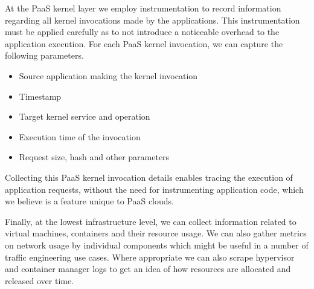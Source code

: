 \documentclass[11pt]{article}
\begin{document}
At the PaaS kernel layer we employ instrumentation to record information regarding all kernel invocations
made by the applications. This instrumentation must be applied carefully as to not introduce a noticeable
overhead to the application execution. For each PaaS kernel invocation, we can capture the 
following parameters.
\begin{itemize}
\item Source application making the kernel invocation
\item Timestamp
\item Target kernel service and operation
\item Execution time of the invocation
\item Request size, hash and other parameters
\end{itemize}
Collecting this PaaS kernel invocation details enables tracing the execution of application 
requests, without the need for instrumenting application code, which we believe is a feature 
unique to PaaS clouds. 

Finally, at the lowest infrastructure level, we can collect information related to virtual machines, containers
and their resource usage. We can also gather metrics on network usage by individual components which
might be useful in a number of traffic engineering use cases. Where appropriate we can also scrape
hypervisor and container manager logs to get an idea of how resources are allocated and released over
time.
\end{document}
